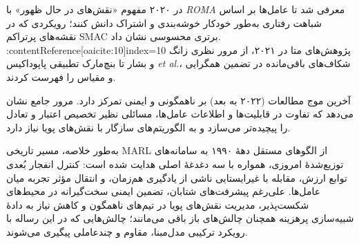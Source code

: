 در ۲۰۲۰ مفهوم «نقش‌های در حال ظهور» با \emph{ROMA} \cite{Wang2020ROMA} معرفی شد تا عامل‌ها بر اساس شباهت رفتاری به‌طور خودکار خوشه‌بندی و اشتراک دانش کنند؛ رویکردی که در نقشه‌های پرتراکم SMAC برتری محسوسی نشان داد. :contentReference[oaicite:10]{index=10} پژوهش‌های متا در ۲۰۲۱، از مرور نظری زانگ و بشار \cite{Zhang2021Survey} تا بنچ‌مارک تطبیقی پاپوداکیس \emph{et al.}، شکاف‌های باقی‌مانده در تضمین همگرایی و مقیاس را فهرست کردند. 

آخرین موج مطالعات (۲۰۲۲ به بعد) بر ناهمگونی و ایمنی تمرکز دارد. مرور جامع \cite{Yu2022Heterogeneous} نشان می‌دهد که تفاوت در قابلیت‌ها و اطلاعات عامل‌ها، مسائلی نظیر تخصیص اعتبار و تعادل را پیچیده‌تر می‌سازد و به الگوریتم‌های سازگار با نقش‌های پویا نیاز دارد.

به‌طور خلاصه، مسیر تاریخی MARL از الگوهای مستقل دههٔ ۱۹۹۰ به سامانه‌های توزیع‌شدهٔ امروزی، همواره با سه دغدغهٔ اصلی هدایت شده است: کنترل انفجار بُعدی توابع ارزش، مقابله با غیرایستایی ناشی از یادگیری هم‌زمان، و انتقال مؤثر تجربه میان عامل‌ها. علی‌رغم پیشرفت‌های شتابان، تضمین ایمنی سخت‌گیرانه در محیط‌های شکست‌پذیر، مدیریت نقش‌های پویا در تیم‌های ناهمگون و کاهش نیاز به دادهٔ شبیه‌سازی پرهزینه همچنان چالش‌های باز باقی می‌مانند؛ چالش‌هایی که در این رساله با رویکرد ترکیبی مدل‌مبنا، مقاوم و چندعاملی پیگیری می‌شوند.
